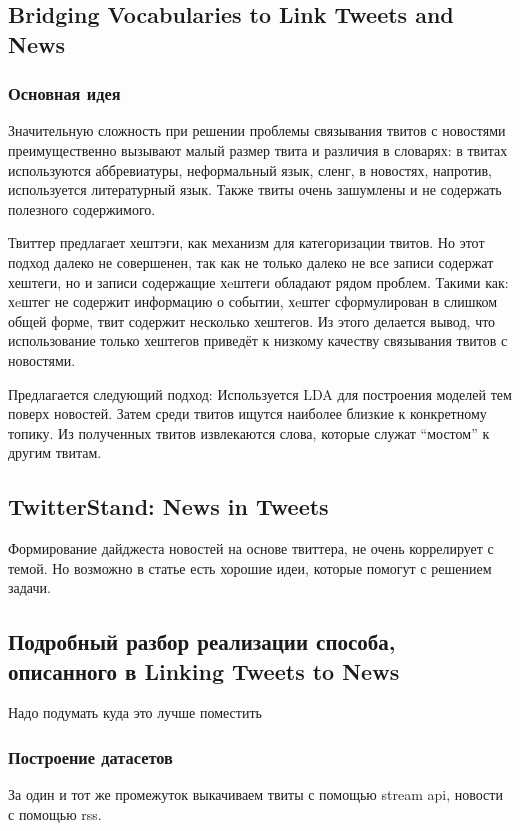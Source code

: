     \subsection{Bridging Vocabularies to Link Tweets and News}
        \subsubsection{Основная идея}
            Значительную сложность при решении проблемы связывания твитов с новостями преимущественно вызывают малый размер твита и различия в словарях: в твитах используются аббревиатуры, неформальный язык, сленг, в новостях, напротив, используется литературный язык. Также твиты очень зашумлены и не содержать полезного содержимого.

            Твиттер предлагает хештэги, как механизм для категоризации твитов. Но этот подход далеко не совершенен, так как не только далеко не все записи содержат хештеги, но и записи содержащие хeштеги обладают рядом проблем. Такими как: хeштег не содержит информацию о событии, хeштег сформулирован в слишком общей форме, твит содержит несколько хештегов. Из этого делается вывод, что использование только хештегов приведёт к низкому качеству связывания твитов с новостями.

            Предлагается следующий подход:
            Используется LDA для построения моделей тем поверх новостей. Затем среди твитов ищутся наиболее близкие к конкретному топику. Из полученных твитов извлекаются слова, которые служат ``мостом'' к другим твитам.
    \subsection{TwitterStand: News in Tweets}
        Формирование дайджеста новостей на основе твиттера, не очень коррелирует с темой. Но возможно в статье есть хорошие идеи, которые помогут с решением задачи.

    \subsection{Подробный разбор реализации способа, описанного в Linking Tweets to News}
        Надо подумать куда это лучше поместить
        \subsubsection{Построение датасетов}
            За один и тот же промежуток выкачиваем твиты с помощью stream api, новости с помощью rss.

